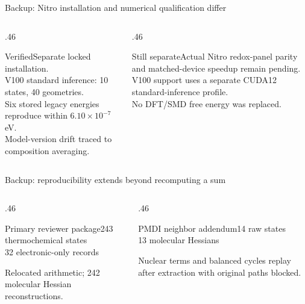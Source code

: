 \begin{frame}{Backup: Nitro installation and numerical qualification differ}
\begin{columns}[T]
\begin{column}{.46\textwidth}\begin{block}{Verified}\small Separate locked installation.\\[.6em]V100 standard inference: 10 states, 40 geometries.\\[.6em]Six stored legacy energies reproduce within $6.10\times10^{-7}$ eV.\\[.6em]Model-version drift traced to composition averaging.\end{block}\end{column}
\begin{column}{.46\textwidth}\begin{block}{Still separate}\small Actual Nitro redox-panel parity and matched-device speedup remain pending.\\[.6em]V100 support uses a separate CUDA12 standard-inference profile.\\[.6em]No DFT/SMD free energy was replaced.\end{block}\end{column}
\end{columns}
\end{frame}

\begin{frame}{Backup: reproducibility extends beyond recomputing a sum}
\begin{columns}[T]
\begin{column}{.46\textwidth}\begin{block}{Primary reviewer package}\large 243 thermochemical states\\32 electronic-only records\par\medskip\small Relocated arithmetic; 242 molecular Hessian reconstructions.\end{block}\end{column}
\begin{column}{.46\textwidth}\begin{block}{PMDI neighbor addendum}\large 14 raw states\\13 molecular Hessians\par\medskip\small Nuclear terms and balanced cycles replay after extraction with original paths blocked.\end{block}\end{column}
\end{columns}
\end{frame}

